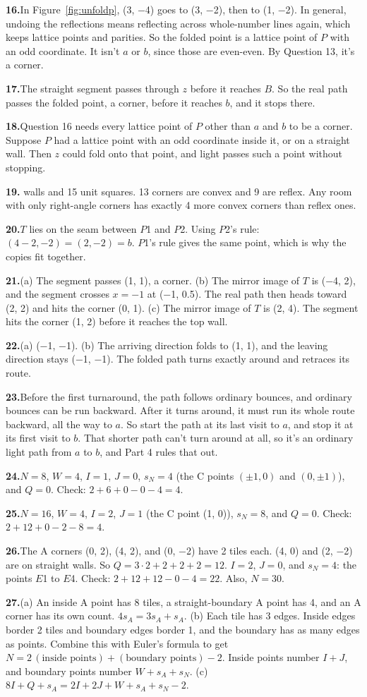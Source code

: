 \documentclass[11pt]{article}
\newcommand\figref[1]{Figure~\ref{fig:#1}}
\newcommand\ans[1]{\par\textbf{\color{wall}#1.}\enspace}
\begin{document}
\ans{16}In \figref{unfoldp}, (3, −4) goes to (3, −2), then to (1, −2). In general, undoing the reflections means reflecting across whole-number lines again, which keeps lattice points and parities. So the folded point is a lattice point of $P$ with an odd coordinate. It isn't $a$ or $b$, since those are even-even. By Question 13, it's a corner.
\ans{17}The straight segment passes through $z$ before it reaches $B$. So the real path passes the folded point, a corner, before it reaches $b$, and it stops there.
\ans{18}Question 16 needs every lattice point of $P$ other than $a$ and $b$ to be a corner. Suppose $P$ had a lattice point with an odd coordinate inside it, or on a straight wall. Then $z$ could fold onto that point, and light passes such a point without stopping.
\ans{19}22 walls and 15 unit squares. 13 corners are convex and 9 are reflex. Any room with only right-angle corners has exactly 4 more convex corners than reflex ones.
\ans{20}$T$ lies on the seam between $P$1 and $P$2. Using $P$2's rule: $(4 - 2, -2) = (2, -2) = b$. $P$1's rule gives the same point, which is why the copies fit together.
\ans{21}(a) The segment passes (1, 1), a corner. (b) The mirror image of $T$ is (−4, 2), and the segment crosses $x = -1$ at (−1, 0.5). The real path then heads toward (2, 2) and hits the corner (0, 1). (c) The mirror image of $T$ is (2, 4). The segment hits the corner (1, 2) before it reaches the top wall.
\ans{22}(a) (−1, −1). (b) The arriving direction folds to (1, 1), and the leaving direction stays (−1, −1). The folded path turns exactly around and retraces its route.
\ans{23}Before the first turnaround, the path follows ordinary bounces, and ordinary bounces can be run backward. After it turns around, it must run its whole route backward, all the way to $a$. So start the path at its last visit to $a$, and stop it at its first visit to $b$. That shorter path can't turn around at all, so it's an ordinary light path from $a$ to $b$, and Part 4 rules that out.
\ans{24}$N = 8$, $W = 4$, $I = 1$, $J = 0$, $s_N = 4$ (the C points $(\pm 1, 0)$ and $(0, \pm 1)$), and $Q = 0$. Check: $2 + 6 + 0 - 0 - 4 = 4$.
\ans{25}$N = 16$, $W = 4$, $I = 2$, $J = 1$ (the C point (1, 0)), $s_N = 8$, and $Q = 0$. Check: $2 + 12 + 0 - 2 - 8 = 4$.
\ans{26}The A corners (0, 2), (4, 2), and (0, −2) have 2 tiles each. (4, 0) and (2, −2) are on straight walls. So $Q = 3 \cdot 2 + 2 + 2 + 2 = 12$. $I = 2$, $J = 0$, and $s_N = 4$: the points $E$1 to $E$4. Check: $2 + 12 + 12 - 0 - 4 = 22$. Also, $N = 30$.
\ans{27}(a) An inside A point has 8 tiles, a straight-boundary A point has 4, and an A corner has its own count. $4s_A = 3s_A + s_A$. (b) Each tile has 3 edges. Inside edges border 2 tiles and boundary edges border 1, and the boundary has as many edges as points. Combine this with Euler's formula to get $N = 2\,(\text{inside points}) + (\text{boundary points}) - 2$. Inside points number $I + J$, and boundary points number $W + s_A + s_N$. (c) $8I + Q + s_A = 2I + 2J + W + s_A + s_N - 2$.
\end{document}
